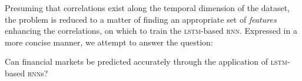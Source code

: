 Presuming that correlations exist along the temporal dimension of the dataset,
the problem is reduced to a matter of finding an appropriate set of
\textit{features} enhancing the correlations, on which to train the
\textsc{lstm}-based \textsc{rnn}.  Expressed in a more concise manner, we
attempt to answer the question:

Can financial markets be predicted accurately through the application of
\textsc{lstm}-based \textsc{rnn}s?
